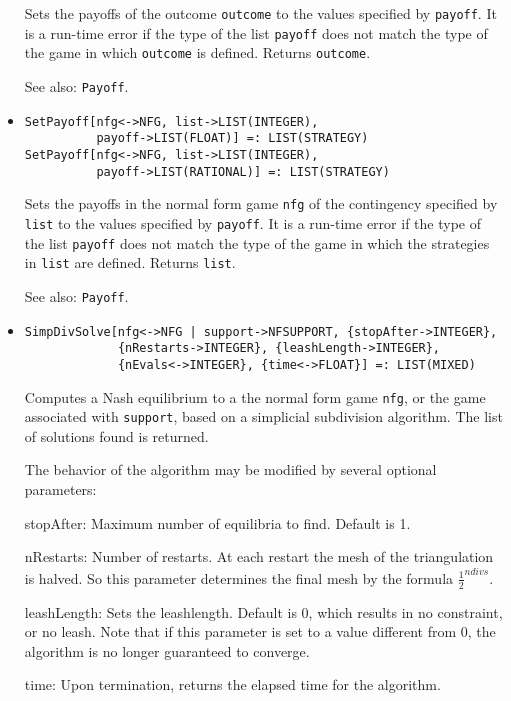 \begin{itemize}
\bd
Sets the payoffs of the outcome \verb+outcome+ to the
values specified by \verb+payoff+.  It is a run-time error if the type
of the list \verb+payoff+ does not match the type of the game in which
\verb+outcome+ is defined.  Returns \verb+outcome+.
\item
[See also:] {\tt Payoff}.
\ed

\item
\protect \large \begin{verbatim}
SetPayoff[nfg<->NFG, list->LIST(INTEGER),
          payoff->LIST(FLOAT)] =: LIST(STRATEGY)
SetPayoff[nfg<->NFG, list->LIST(INTEGER), 
          payoff->LIST(RATIONAL)] =: LIST(STRATEGY)
\end{verbatim}\normalsize

\bd
Sets the payoffs in the normal form game \verb+nfg+ of the
contingency specified by \verb+list+ to the values specified by
\verb+payoff+.  It is a run-time error if the type of the list
\verb+payoff+ does not match the type of the game in which the
strategies in \verb+list+ are defined.  Returns \verb+list+.
\item
[See also:] {\tt Payoff}.  
\ed

\item
\protect \large \begin{verbatim}
SimpDivSolve[nfg<->NFG | support->NFSUPPORT, {stopAfter->INTEGER}, 
             {nRestarts->INTEGER}, {leashLength->INTEGER},
             {nEvals<->INTEGER}, {time<->FLOAT}] =: LIST(MIXED)
\end{verbatim}\normalsize

\bd
Computes a Nash equilibrium to a the normal form game \verb+nfg+, or the
game associated with \verb+support+, based on a simplicial subdivision
algorithm.  The list of solutions found is returned.

The behavior of the algorithm may be modified by several optional
parameters:

\bd
\item
[stopAfter:] Maximum number of equilibria to find. Default is 1.  
\item 
[nRestarts:] Number of restarts.  At each restart the mesh of the
triangulation is halved.  So this parameter determines the final mesh
by the formula $\frac{1}{2}^{ndivs}$.
\item
[leashLength:] Sets the leashlength. Default is 0, which results in no
constraint, or no leash.  Note that if this parameter is set to a value
different from 0, the algorithm is no longer guaranteed to converge.
\item
[time:] Upon termination, returns the elapsed time for the algorithm.
\ed
\ed


\end{itemize}
